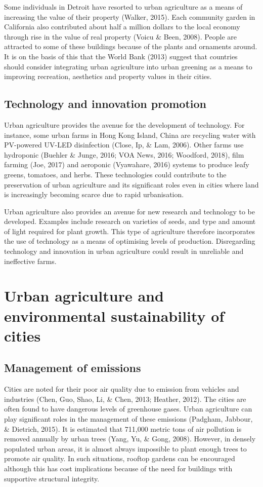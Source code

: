 Some individuals in Detroit have resorted to urban agriculture as a means of increasing the value of their property (Walker, 2015). Each community garden in California also contributed about half a million dollars to the local economy through rise in the value of real property (Voicu \& Been, 2008). People are attracted to some of these buildings because of the plants and ornaments around. It is on the basis of this that the World Bank (2013) suggest that countries should consider integrating urban agriculture into urban greening as a means to improving recreation, aesthetics and property values in their cities.

\subsection{Technology and innovation promotion}

Urban agriculture provides the avenue for the development of technology. For instance, some urban farms in Hong Kong Island, China are recycling water with PV-powered UV-LED disinfection (Close, Ip, \& Lam, 2006). Other farms use hydroponic (Buehler \& Junge, 2016; VOA News, 2016; Woodford, 2018), film farming (Joe, 2017) and aeroponic (Vyawahare, 2016) systems to produce leafy greens, tomatoes, and herbs. These technologies could contribute to the preservation of urban agriculture and its significant roles even in cities where land is increasingly becoming scarce due to rapid urbanisation.

Urban agriculture also provides an avenue for new research and technology to be developed. Examples include research on varieties of seeds, and type and amount of light required for plant growth. This type of agriculture therefore incorporates the use of technology as a means of optimising levels of production. Disregarding technology and innovation in urban agriculture could result in unreliable and ineffective farms.

\section{Urban agriculture and environmental sustainability of cities}

\subsection{Management of emissions}

Cities are noted for their poor air quality due to emission from vehicles and industries (Chen, Guo, Shao, Li, \& Chen, 2013; Heather, 2012). The cities are often found to have dangerous levels of greenhouse gases. Urban agriculture can play significant roles in the management of these emissions (Padgham, Jabbour, \& Dietrich, 2015). It is estimated that 711,000 metric tons of air pollution is removed annually by urban trees (Yang, Yu, \& Gong, 2008). However, in densely populated urban areas, it is almost always impossible to plant enough trees to promote air quality. In such situations, rooftop gardens can be encouraged although this has cost implications because of the need for buildings with supportive structural integrity.


